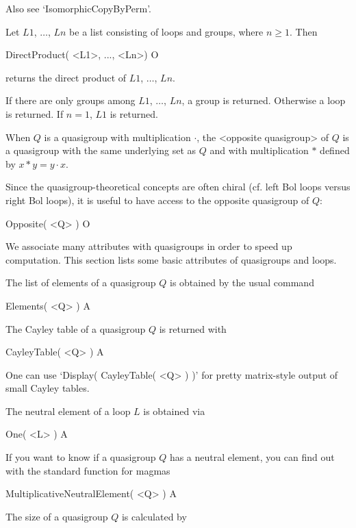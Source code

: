Also see `IsomorphicCopyByPerm'.


\noindent Let $L1$, $\dots$, $Ln$ be a list consisting of loops and groups,
where $n\ge 1$. Then

\>DirectProduct( <L1>, ..., <Ln>) O

returns the direct product of $L1$, $\dots$, $Ln$.

If there are only groups among $L1$, $\dots$, $Ln$, a group is returned.
Otherwise a loop is returned. If $n=1$, $L1$ is returned.


When $Q$ is a quasigroup with multiplication $\cdot$, the <opposite quasigroup>
%
%
 of $Q$ is a quasigroup with the same underlying set as $Q$ and with
multiplication $*$ defined by $x*y=y\cdot x$.

Since the quasigroup-theoretical concepts are often chiral (cf. left Bol loops
versus right Bol loops), it is useful to have access to the opposite quasigroup
of $Q$:

\>Opposite( <Q> ) O


We associate many attributes with quasigroups in order to speed up computation.
This section lists some basic attributes of quasigroups and loops.

The list of elements of a quasigroup $Q$ is obtained by the usual command

\>Elements( <Q> ) A

The Cayley table of a quasigroup $Q$ is returned with

\>CayleyTable( <Q> ) A

One can use `Display( CayleyTable( <Q> ) )' for pretty matrix-style output of
small Cayley tables.

The neutral element of a loop $L$ is obtained via

\>One( <L> ) A

If you want to know if a quasigroup $Q$ has a neutral element, you can find out
with the standard function for magmas

\>MultiplicativeNeutralElement( <Q> ) A

The size of a quasigroup $Q$ is calculated by

